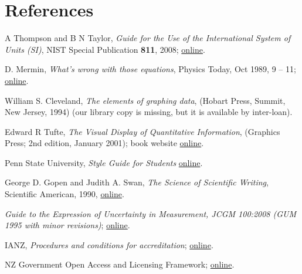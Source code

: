 \section{References}

\begingroup
\renewcommand{\section}[2]{}%

\begin{thebibliography}{9}
A Thompson and B N Taylor, \textit{Guide for the Use of the International System of Units (SI)}, NIST Special Publication \textbf{811}, 2008; \href{http://www.nist.gov/pml/pubs/sp811/index.cfm}{online}.

D. Mermin, \textit{What’s wrong with those equations}, Physics Today, Oct 1989, 9 – 11; \href{http://home.sandiego.edu/~severn/p480w/mathprose.pdf}{online}. 

William S. Cleveland, \textit{The elements of graphing data}, (Hobart Press, Summit, New Jersey, 1994) (our library copy is missing, but it is available by inter-loan).

Edward R Tufte, \textit{The Visual Display of Quantitative Information}, (Graphics Press; 2nd edition, January 2001); book website \href{http://www.edwardtufte.com/tufte/books_vdqi}{online}.

Penn State University, \textit{Style Guide for Students} \href{https://www.e-education.psu.edu/styleforstudents/}{online}.

George D. Gopen and Judith A. Swan, \textit{The Science of Scientific Writing}, Scientific American, 1990, \href{https://www.e-education.psu.edu/styleforstudents/c10_p6.html}{online}.

 \textit{Guide to the Expression of Uncertainty in Measurement, JCGM 100:2008 (GUM 1995 with minor revisions)}; \href{http://www.bipm.org/utils/common/documents/jcgm/JCGM_100_2008_E.pdf}{online}.

 IANZ, \textit{Procedures and conditions for accreditation}; \href{http://www.ianz.govt.nz/resources/documents-2/supplementary-criteria/}{online}.

 NZ Government Open Access and Licensing Framework; \href{https://data.govt.nz/toolkit/policies/nzgoal/}{online}.


\end{thebibliography}
